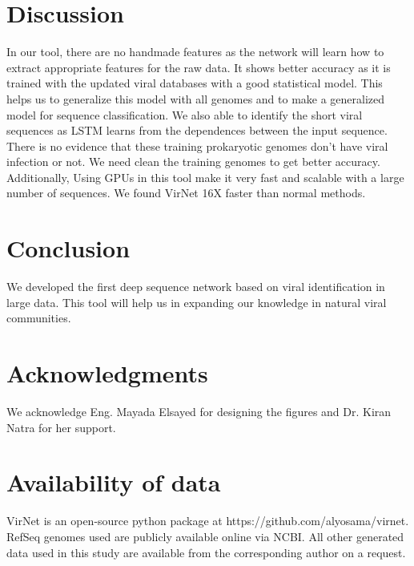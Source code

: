 \documentclass[conference]{IEEEtran}
\begin{document}
\section{Discussion}

In our tool, there are no handmade features as the network will learn how to extract appropriate features for the raw data. It shows better accuracy as it is trained with the updated viral databases with a good statistical model. This helps us to generalize this model with all genomes and to make a generalized model for sequence classification. We also able to identify the short viral sequences as LSTM learns from the dependences between the input sequence. 
There is no evidence that these training prokaryotic genomes don't have viral infection or not. We need clean the training genomes to get better accuracy. Additionally, Using GPUs in this tool make it very fast and scalable with a large number of sequences. We found VirNet 16X faster than normal methods. 

\section{Conclusion}

We developed the first deep sequence network based on viral identification in large data. This tool will help us in expanding our knowledge in natural viral communities.

\section*{Acknowledgments}

We acknowledge Eng. Mayada Elsayed for designing the figures and Dr. Kiran Natra for her support.  


\section*{Availability of data}

VirNet is an open-source python package at https://github.com/alyosama/virnet. 
RefSeq genomes used are publicly available online via NCBI. All other generated data used in this study are available from the corresponding author on a request. 




\end{document}
